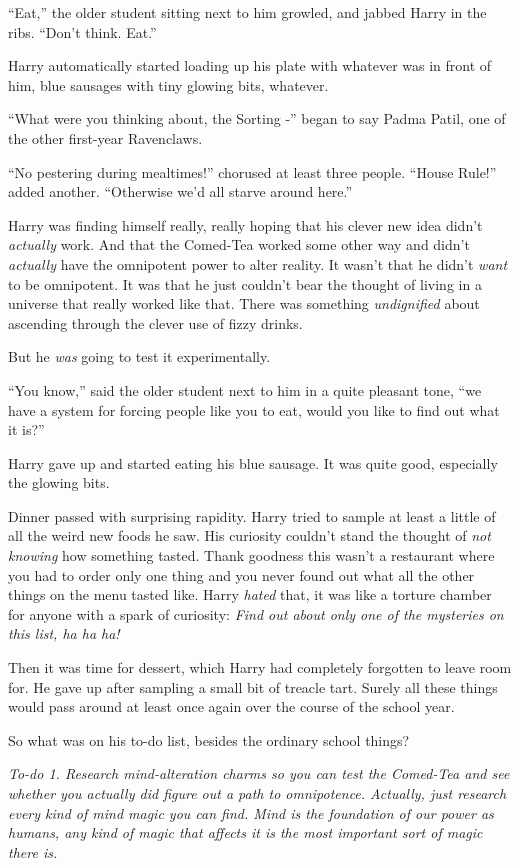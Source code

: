 ``Eat,'' the older student sitting next to him growled, and jabbed Harry
in the ribs. ``Don't think. Eat.''

Harry automatically started loading up his plate with whatever was in
front of him, blue sausages with tiny glowing bits, whatever.

``What were you thinking about, the Sorting -'' began to say Padma
Patil, one of the other first-year Ravenclaws.

``No pestering during mealtimes!'' chorused at least three people.
``House Rule!'' added another. ``Otherwise we'd all starve around
here.''

Harry was finding himself really, really hoping that his clever new idea
didn't \emph{actually} work. And that the Comed-Tea worked some other
way and didn't \emph{actually} have the omnipotent power to alter
reality. It wasn't that he didn't \emph{want} to be omnipotent. It was
that he just couldn't bear the thought of living in a universe that
really worked like that. There was something \emph{undignified} about
ascending through the clever use of fizzy drinks.

But he \emph{was} going to test it experimentally.

``You know,'' said the older student next to him in a quite pleasant
tone, ``we have a system for forcing people like you to eat, would you
like to find out what it is?''

Harry gave up and started eating his blue sausage. It was quite good,
especially the glowing bits.

Dinner passed with surprising rapidity. Harry tried to sample at least a
little of all the weird new foods he saw. His curiosity couldn't stand
the thought of \emph{not knowing} how something tasted. Thank goodness
this wasn't a restaurant where you had to order only one thing and you
never found out what all the other things on the menu tasted like. Harry
\emph{hated} that, it was like a torture chamber for anyone with a spark
of curiosity: \emph{Find out about only one of the mysteries on this
list, ha ha ha!}

Then it was time for dessert, which Harry had completely forgotten to
leave room for. He gave up after sampling a small bit of treacle tart.
Surely all these things would pass around at least once again over the
course of the school year.

So what was on his to-do list, besides the ordinary school things?

\emph{To-do 1. Research mind-alteration charms so you can test the
Comed-Tea and see whether you actually did figure out a path to
omnipotence. Actually, just research every kind of mind magic you can
find. Mind is the foundation of our power as humans, any kind of magic
that affects it is the most important sort of magic there is.}

